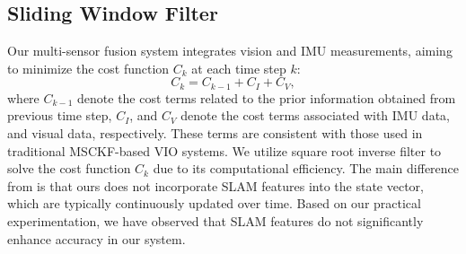 \subsection{Sliding Window Filter} 
    Our multi-sensor fusion system  integrates vision and IMU measurements, aiming to minimize the cost function $C_{k}$ at each time step $k$:
  \begin{equation}
    C_{k}=C_{k-1}+C_I+C_V,
  \end{equation}
  where $C_{k-1}$ denote the cost terms related to the prior information obtained from previous time step, $C_I$, and $C_V$ denote the cost terms associated with IMU data, and visual data, respectively. These terms are consistent with those used in traditional MSCKF-based VIO systems. 
  We utilize square root inverse filter\cite{maybeck1982stochastic-square-root, wu2015square} to solve the cost function $C_{k}$ due to its computational efficiency.
 The main difference from \cite{wu2015square} is that ours does not incorporate SLAM features into the state vector, which are typically continuously updated over time. Based on our practical experimentation, we have observed that SLAM features do not significantly enhance accuracy in our system.
